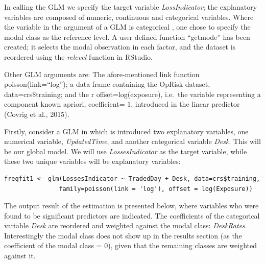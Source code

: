 \documentclass{DissertateUSU}
\begin{document}
\singlespacing

\doublespacing

In calling the GLM we specify the target variable \emph{LossIndicator};
the explanatory variables are composed of numeric, continuous and
categorical variables. Where the variable in the argument of a GLM is
categorical , one chose to specify the modal class as the reference
level. A user defined function ``getmode'' has been created; it selects
the modal observation in each factor, and the dataset is reordered using
the \emph{relevel} function in RStudio.

\singlespacing

\doublespacing

Other GLM arguments are: The afore-mentioned link function
poisson(link=``log''); a data frame containing the OpRisk dataset,
data=crs\$training; and the r offset=log(exposure), i.e.~the variable
representing a component known apriori, coefficient= \(1\), introduced
in the linear predictor (Covrig et al., 2015).\medskip

Firstly, consider a GLM in which is introduced two explanatory
variables, one numerical variable, \emph{UpdatedTime}, and another
categorical variable \emph{Desk}. This will be our global model. We will
use \emph{LossesIndicator} as the target variable, while these two
unique variables will be explanatory variables:

\singlespacing

\begin{verbatim}
freqfit1 <- glm(LossesIndicator ~ TradedDay + Desk, data=crs$training, 
               family=poisson(link = 'log'), offset = log(Exposure))
\end{verbatim}

\doublespacing

The output result of the estimation is presented below, where variables
who were found to be significant predictors are indicated. The
coefficients of the categorical variable \emph{Desk} are reordered and
weighted against the modal class: \emph{DeskRates}. Interestingly the
modal class does not show up in the results section (as the coefficient
of the modal class = \(0\)), given that the remaining classes are
weighted against it.

\singlespacing
\end{document}
